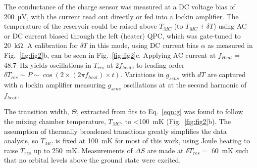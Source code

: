 \documentclass[twocolumn,showpacs,preprintnumbers,amsmath,amssymb,pra,aps,superscriptaddress]{revtex4-1}
\begin{document}
The conductance of the charge sensor was measured at a DC voltage bias of \SI{200}{\micro\volt}, with the current read out directly or fed into a lockin amplifier.  The temperature of the reservoir could be raised above $T_{MC}$ (to $T_{MC} + \delta T$) using AC or DC current biased through the left (heater) QPC, which was gate-tuned to \SI{20}{\kilo\ohm}. A calibration for $\delta T$ in this mode, using DC current bias $\alpha$ as measured in Fig.~\ref{fig:fig2}b, can be seen in Fig.~\ref{fig:fig2}c. Applying AC current at $f_{Heat} =$ \SI{48.7}{\hertz} yields oscillations in $T_{res}$ at $2f_{heat}$; to leading order $\delta T_{res} \sim P \sim \cos(2 \times (2 \pi f_{heat}) \times t)$. Variations in $g_{sens}$ with $dT$ are captured with a lockin amplifier measuring $g_{sens}$ oscillations at at the second harmonic of $f_{heat}$.

The transition width, $\Theta$, extracted from fits to Eq.~\ref{eqn:g} was found to follow the mixing chamber temperature, $T_{MC}$, to \SI{<100}{\milli\kelvin} (Fig.~\ref{fig:fig2}b). The assumption of thermally broadened transitions greatly simplifies the data analysis, so $T_{MC}$ is fixed at \SI{100}{\milli\kelvin} for most of this work, using Joule heating to raise $T_{res}$ up to \SI{250}{\milli\kelvin}. Measurements of $\Delta S$ are made at $\delta T_{res} = $ \SI{60}{\milli\kelvin} such that no orbital levels above the ground state were excited.


{}

\end{document}

